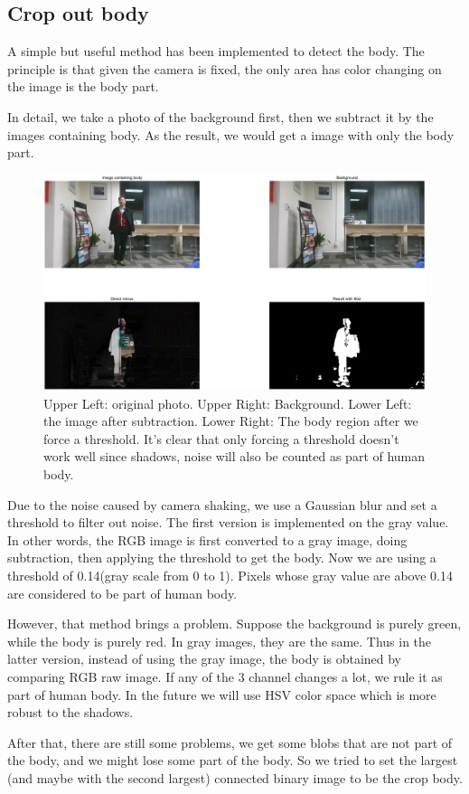 \documentclass[conference,compsoc]{IEEEtran}
\begin{document}
\subsection{Crop out body}
\par
A simple but useful method has been implemented to detect the body. The principle is that given the camera is fixed, the only area has color changing on the image is the body part.
\par
In detail, we take a photo of the background first, then we subtract it by the images containing body. As the result, we would get a image with only the body part.
\begin{figure}[h]
	\centering
	\includegraphics[width=\linewidth]{./Pic/CropBody.png}
	\caption{Upper Left: original photo. Upper Right: Background. Lower Left: the image after subtraction. Lower Right: The body region after we force a threshold. It's clear that only forcing a threshold doesn't work well since shadows, noise will also be counted as part of human body.}
\end{figure}
\par
	Due to the noise caused by camera shaking, we use a Gaussian blur and set a threshold to filter out noise. 
	The first version is implemented on the gray value. In other words, the RGB image is first converted to a gray image, doing subtraction, then applying the threshold to get the body.
	Now we are using a threshold of 0.14(gray scale from 0 to 1). 
	Pixels whose gray value are above 0.14 are considered to be part of human body.
\par
	However, that method brings a problem. Suppose the background is purely green, while the body is purely red. 
	In gray images, they are the same. 
	Thus in the latter version, instead of using the gray image, the body is obtained by comparing RGB raw image. 
	If any of the 3 channel changes a lot, we rule it as part of human body. 
	In the future we will use HSV color space which is more robust to the shadows.
\par
	After that, there are still some problems, we get some blobs that are not part of the body, and we might lose some part of the body. So we tried to set the largest (and maybe with the second largest) connected binary image to be the crop body.
\end{document}
